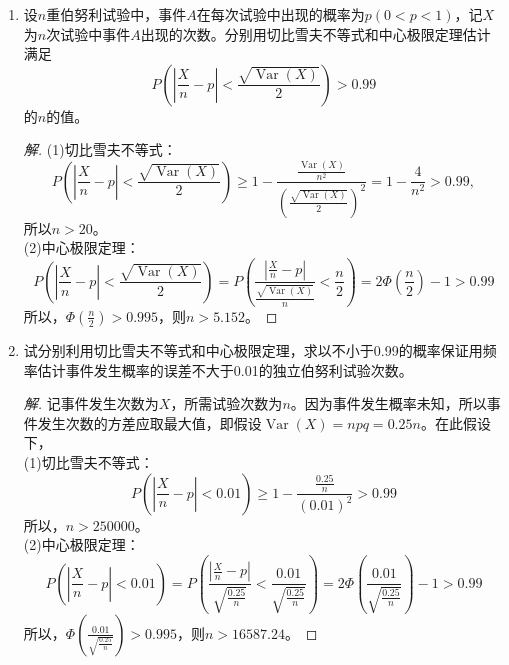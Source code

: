 \documentclass[12pt]{article}
\newcommand{\hei}{\CJKfamily{hei}}                          %
\begin{document}
\begin{enumerate}
\item {\hei 设$ n $重伯努利试验中，事件$ A $在每次试验中出现的概率为$ p\left( 0<p<1 \right) $，记$ X $为$ n $次试验中事件$ A $出现的次数。分别用切比雪夫不等式和中心极限定理估计满足
	\begin{equation}\nonumber
		P\left( \left| {\frac{X}{n}}-p \right|<{\frac{\sqrt{\operatorname{Var}\left( X \right)}}{2}} \right)>0.99
	\end{equation}
	的$ n $的值。}
\begin{proof}[解]
	(1)切比雪夫不等式：\\
	\begin{equation}
		P\left( \left| \frac{X}{n}-p \right|<\frac{\sqrt{\operatorname{Var}\left( X \right)}}{2} \right) \geq 1-\frac{\frac{\operatorname{Var}\left( X \right)}{{{n}^{2}}}}{{{\left( \frac{\sqrt{\operatorname{Var}\left( X \right)}}{2} \right)}^{2}}}=1-\frac{4}{{{n}^{2}}}>0.99,
	\end{equation}
	所以$ n > 20 $。\\
	(2)中心极限定理：\\
	\begin{equation}
		P\left( \left| \frac{X}{n}-p \right|<\frac{\sqrt{\operatorname{Var}\left( X \right)}}{2} \right)=P\left( \frac{\left| \frac{X}{n}-p \right|}{\frac{\sqrt{\operatorname{Var}\left( X \right)}}{n}}<\frac{n}{2} \right)=2\Phi \left( \frac{n}{2} \right)-1>0.99
	\end{equation}
	所以，$ \Phi \left( \displaystyle{\frac{n}{2}} \right)>0.995 $，则$ n>5.152 $。
\end{proof}


\item {\hei 试分别利用切比雪夫不等式和中心极限定理，求以不小于0.99的概率保证用频率估计事件发生概率的误差不大于0.01的独立伯努利试验次数。}
\begin{proof}[解]
	记事件发生次数为$ X $，所需试验次数为$ n $。因为事件发生概率未知，所以事件发生次数的方差应取最大值，即假设$ \operatorname{Var}\left( X \right)=npq=0.25n $。在此假设下，\\
	(1)切比雪夫不等式：\\
	\begin{equation}
		P\left( \left| \frac{X}{n}-p \right|<0.01 \right)\ge 1-\frac{\frac{0.25}{n}}{{{\left( 0.01 \right)}^{2}}}>0.99
	\end{equation}
	所以，$ n > 250000 $。\\
	(2)中心极限定理：\\
	\begin{equation}
		P\left( \left| \frac{X}{n}-p \right|<0.01 \right)=P\left( \frac{\left| \frac{X}{n}-p \right|}{\sqrt{\frac{0.25}{n}}}<\frac{0.01}{\sqrt{\frac{0.25}{n}}} \right)=2\Phi \left( \frac{0.01}{\sqrt{\frac{0.25}{n}}} \right)-1>0.99
	\end{equation}
	所以，$ \Phi \left( \displaystyle{\frac{0.01}{\sqrt{\frac{0.25}{n}}}} \right)>0.995 $，则$ n>16587.24 $。
\end{proof}



\end{enumerate}
\end{document}
